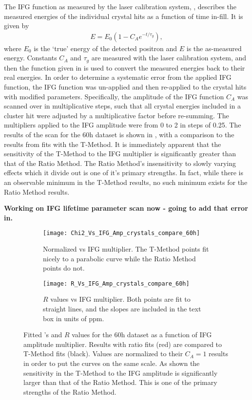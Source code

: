 The IFG function as measured by the laser calibration system, , describes the measured energies of the individual crystal hits as a function of time in-fill. It is given by \cite{IFG}
    \begin{align} \label{eq:IFG}
        E = E_{0}(1 - C_{A} e^{-t/\tau_{g}}),
    \end{align}
where $E_{0}$ is the `true' energy of the detected positron and $E$ is the as-measured energy. Constants $C_{A}$ and $\tau_{g}$ are measured with the laser calibration system, and then the function given in  is used to convert the measured energies back to their real energies. In order to determine a systematic error from the applied IFG function, the IFG function was un-applied and then re-applied to the crystal hits with modified parameters. Specifically, the amplitude of the IFG function $C_{A}$ was scanned over in multiplicative steps, such that all crystal energies included in a cluster hit were adjusted by a multiplicative factor before re-summing. The multipliers applied to the IFG amplitude were from 0 to 2 in steps of 0.25. The results of the scan for the 60h dataset is shown in , with a comparison to the results from fits with the T-Method. It is immediately apparent that the sensitivity of the T-Method to the IFG multiplier is significantly greater than that of the Ratio Method. The Ratio Method's insensitivity to slowly varying effects which it divide out is one of it's primary strengths. In fact, while there is an observable minimum in the T-Method \chisq results, no such minimum exists for the Ratio Method results.

\textbf{Working on IFG lifetime parameter scan now - going to add that error in.}


\begin{figure}
\centering
    \begin{subfigure}[]{0.45\textwidth}
        \centering
        \texttt{[image: Chi2\_Vs\_IFG\_Amp\_crystals\_compare\_60h]}
        \caption{Normalized \chisq vs IFG multiplier. The T-Method points fit nicely to a parabolic curve while the Ratio Method points do not.}
    \end{subfigure}%
    \hspace{4mm}
    \begin{subfigure}[]{0.45\textwidth}
        \centering
        \texttt{[image: R\_Vs\_IFG\_Amp\_crystals\_compare\_60h]}
        \caption{$R$ values vs IFG multiplier. Both points are fit to straight lines, and the slopes are included in the text box in units of ppm.}
    \end{subfigure}
\caption[]{Fitted \chisq's and $R$ values for the 60h dataset as a function of IFG amplitude multiplier. Results with ratio fits (red) are compared to T-Method fits (black). Values are normalized to their $C_{A} = 1$ results in order to put the curves on the same scale. As shown the sensitivity in the T-Method to the IFG amplitude is significantly larger than that of the Ratio Method. This is one of the primary strengths of the Ratio Method.}
\label{fig:IFG_amplitude}
\end{figure}



